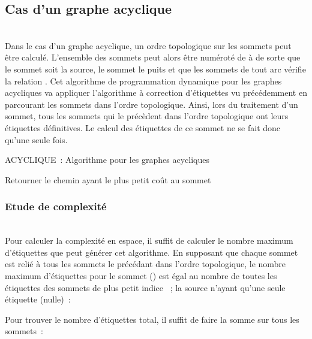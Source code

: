 \documentclass[10pt,francais]{llncs}
\begin{document}
\subsection{Cas d'un graphe acyclique}\label{sub-resol-acycl}
~\\
Dans le cas d'un graphe acyclique, un ordre topologique sur les sommets peut \^etre calcul\'e. L'ensemble des sommets peut alors \^etre num\'erot\'e de  \`a  de sorte que le sommet  soit la source, le sommet  le puits et que les sommets de tout arc  v\'erifie la relation . Cet algorithme de programmation dynamique pour les graphes acycliques va appliquer l'algorithme \`a correction d'\'etiquettes vu pr\'ec\'edemment en parcourant les sommets dans l'ordre topologique. Ainsi, lors du traitement d'un sommet, tous les sommets qui le pr\'ec\`edent dans l'ordre topologique ont leurs \'etiquettes d\'efinitives. Le calcul des \'etiquettes de ce sommet ne se fait donc qu'une seule fois.

\begin{algorithm}\label{algo-acyclique}
\caption{ACYCLIQUE~: Algorithme pour les graphes acycliques}
\BlankLine
{}
\BlankLine
{}
\;
Retourner le chemin ayant le plus petit co\^ut au sommet \;
\end{algorithm}

\subsubsection{Etude de complexit\'e}\label{sub-resol-acycl-complex}
~\\
Pour calculer la complexit\'e en espace, il suffit de calculer le nombre maximum d'\'etiquettes que peut g\'en\'erer cet algorithme. En supposant que chaque sommet est reli\'e \`a tous les sommets le pr\'ec\'edant dans l'ordre topologique, le nombre maximum d'\'etiquettes pour le sommet  () est \'egal au nombre de toutes les \'etiquettes des sommets de plus petit indice ~; la source n'ayant qu'une seule \'etiquette (nulle)~:

Pour trouver le nombre d'\'etiquettes total, il suffit de faire la somme sur tous les sommets~:
\end{document}
